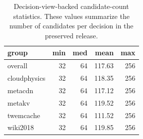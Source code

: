 \begin{table}[t]
  \centering
  \footnotesize
  \caption{Decision-view-backed candidate-count statistics. These values summarize the number of candidates per decision in the preserved release.}
  \label{tab:candidate-count-stats}
  \begin{tabular}{@{}lrrrr@{}}
    \toprule
    group & min & med & mean & max \\
    \midrule
    overall & 32 & 64 & 117.63 & 256 \\
    cloudphysics & 32 & 64 & 118.35 & 256 \\
    metacdn & 32 & 64 & 117.12 & 256 \\
    metakv & 32 & 64 & 119.52 & 256 \\
    twemcache & 32 & 64 & 111.52 & 256 \\
    wiki2018 & 32 & 64 & 119.85 & 256 \\
    \bottomrule
  \end{tabular}
\end{table}
